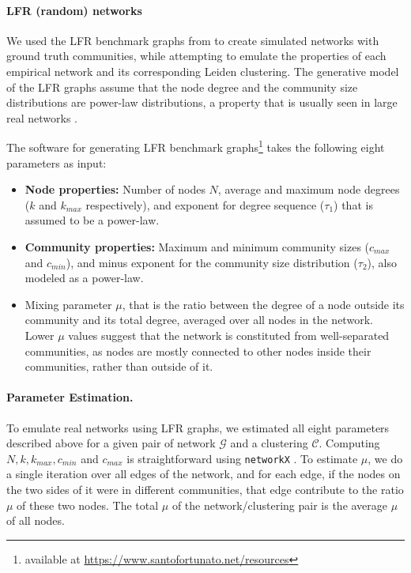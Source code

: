 \documentclass[11pt]{article}   	%
\begin{document}
\paragraph{LFR (random) networks}

We used the LFR benchmark graphs from \cite{lancichinetti2008benchmark} to create simulated networks with ground truth communities, while attempting to emulate the properties of each empirical network and its corresponding Leiden clustering. The generative model of the LFR graphs assume that the node degree and the community size distributions are power-law distributions, a property that is usually seen in large real networks \citep{albert2002statistical}.

The software for generating LFR benchmark graphs\footnote{available at \href{https://www.santofortunato.net/resources}{https://www.santofortunato.net/resources}} takes the following eight parameters as input:
\begin{itemize}
    \item  \textbf{Node properties:} Number of nodes $N$, average and maximum node degrees ($k$ and $k_{max}$ respectively), and exponent for degree sequence ($\tau_1$) that is assumed to be a power-law.
    \item \textbf{Community properties:} Maximum and minimum community sizes ($c_{max}$ and $c_{min}$), and minus exponent for the community size distribution ($\tau_2$), also modeled as a power-law.
    \item Mixing parameter $\mu$, that is the ratio between the degree of a node outside its community and its total degree, averaged over all nodes in the network. Lower $\mu$ values suggest that the network is constituted from well-separated communities, as nodes are mostly connected to other nodes inside their communities, rather than outside of it.
\end{itemize}






\paragraph{Parameter Estimation.} To emulate real networks using LFR graphs, we estimated all eight parameters described above for a given pair of network $\mathcal{G}$ and a clustering $\mathcal{C}$. Computing $N, k, k_{max}, c_{min}$ and $c_{max}$ is straightforward using \texttt{networkX} \citep{hagberg2008exploring}. To estimate $\mu$, we do a single iteration over all edges of the network, and for each edge, if the nodes on the two sides of it were in different communities, that edge contribute to the ratio $\mu$ of these two nodes. The total $\mu$ of the network/clustering pair is the average $\mu$ of all nodes.
\end{document}
